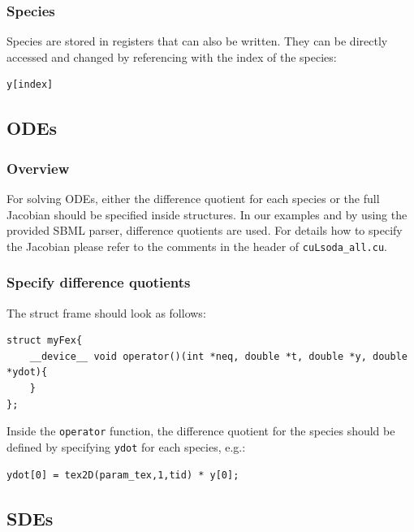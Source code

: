 \documentclass [11pt, a4paper, openany, twoside=off] {article}
\begin{document}
\subsubsection{Species}
Species are stored in registers that can also be written. They can be directly accessed and changed by referencing with the index of the species:
\begin{verbatim}
y[index]
\end{verbatim}

\subsection{ODEs}
\subsubsection{Overview}
For solving ODEs, either the difference quotient for each species or the full Jacobian should be specified inside structures. In our examples and by using the provided SBML parser, difference quotients are used.  For details how to specify the Jacobian please refer to the comments in the header of \verb$cuLsoda_all.cu$.

\subsubsection{Specify difference quotients}
The struct frame should look as follows:
\begin{verbatim}
struct myFex{
    __device__ void operator()(int *neq, double *t, double *y, double *ydot){
    }
};
\end{verbatim}
Inside the \verb$operator$ function, the difference quotient for the species should be defined by specifying \verb$ydot$ for each species, e.g.:
\begin{verbatim}
ydot[0] = tex2D(param_tex,1,tid) * y[0];
\end{verbatim}

\subsection{SDEs}
\end{document}

